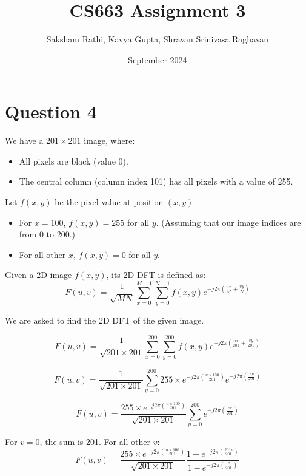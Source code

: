 \documentclass[12pt]{article}
\title{{\bf CS663 Assignment 3}}
\author{Saksham Rathi, Kavya Gupta, Shravan Srinivasa Raghavan}
\date{September 2024}
\begin{document}
\maketitle
\clearpage
\section*{Question 4}
We have a $201\times 201$ image, where:
\begin{itemize}
    \item All pixels are black (value 0).
    \item The central column (column index 101) has all pixels with a value of 255.
\end{itemize}

Let $f(x, y)$ be the pixel value at position $(x, y)$:
\begin{itemize}
    \item For $x = 100$, $f(x, y) = 255$ for all $y$. (Assuming that our image indices are from 0 to 200.)
    \item For all other $x$, $f(x, y) = 0$ for all $y$.
\end{itemize}

Given a 2D image $f(x, y)$, its 2D DFT is defined as:
\begin{equation}
    F(u, v) = \frac{1}{\sqrt{MN}}\sum_{x=0}^{M-1} \sum_{y=0}^{N-1} f(x, y) e^{-j2\pi\left(\frac{ux}{M} + \frac{vy}{N}\right)}
\end{equation}

We are asked to find the 2D DFT of the given image.

\begin{equation}
    F(u, v) = \frac{1}{\sqrt{201\times 201}}\sum_{x=0}^{200} \sum_{y=0}^{200} f(x, y) e^{-j2\pi\left(\frac{ux}{201} + \frac{vy}{201}\right)}
\end{equation}

\begin{equation}
    F(u, v) = \frac{1}{\sqrt{201\times 201}} \sum_{y=0}^{200} 255\times e^{-j2\pi\left(\frac{u\times 100}{201}\right)} e^{-j2\pi\left(\frac{vy}{201}\right)}
\end{equation}

\begin{equation}
    F(u, v) = \frac{255\times e^{-j2\pi\left(\frac{u\times 100}{201}\right)}}{\sqrt{201\times 201}} \sum_{y=0}^{200} e^{-j2\pi\left(\frac{vy}{201}\right)}
\end{equation}

For $v = 0$, the sum is 201. For all other $v$:
\begin{equation}
    F(u, v) = \frac{255\times e^{-j2\pi\left(\frac{u\times 100}{201}\right)}}{\sqrt{201\times 201}} \frac{1-e^{-j2\pi\left(\frac{201v}{201}\right)}}{1-e^{-j2\pi\left(\frac{v}{201}\right)}}
\end{equation}
\end{document}
